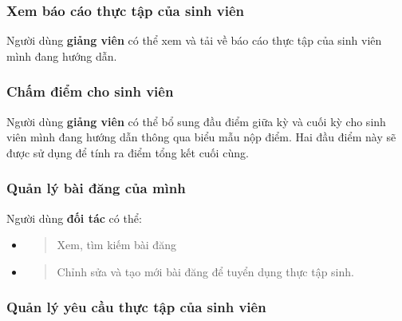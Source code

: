 \documentclass[./../main.tex]{subfiles}
\begin{document}
  \hypertarget{xem-buxe1o-cuxe1o-thux1ef1c-tux1eadp-cux1ee7a-sinh-viuxean}{%
  \subsubsection{Xem báo cáo thực tập của sinh
  viên}\label{xem-buxe1o-cuxe1o-thux1ef1c-tux1eadp-cux1ee7a-sinh-viuxean}}
  
  Người dùng \textbf{giảng viên} có thể xem và tải về báo cáo thực tập của
  sinh viên mình đang hướng dẫn.
  
  \hypertarget{chux1ea5m-ux111iux1ec3m-cho-sinh-viuxean}{%
  \subsubsection{Chấm điểm cho sinh
  viên}\label{chux1ea5m-ux111iux1ec3m-cho-sinh-viuxean}}
  
  Người dùng \textbf{giảng viên} có thể bổ sung đầu điểm giữa kỳ và cuối
  kỳ cho sinh viên mình đang hướng dẫn thông qua biểu mẫu nộp điểm. Hai
  đầu điểm này sẽ được sử dụng để tính ra điểm tổng kết cuối cùng.
  
  \hypertarget{quux1ea3n-luxfd-buxe0i-ux111ux103ng-cux1ee7a-muxecnh}{%
  \subsubsection{Quản lý bài đăng của
  mình}\label{quux1ea3n-luxfd-buxe0i-ux111ux103ng-cux1ee7a-muxecnh}}
  
  Người dùng \textbf{đối tác} có thể:
  
  \begin{itemize}
  \item
    \begin{quote}
    Xem, tìm kiếm bài đăng
    \end{quote}
  \item
    \begin{quote}
    Chỉnh sửa và tạo mới bài đăng để tuyển dụng thực tập sinh.
    \end{quote}
  \end{itemize}
  
  \hypertarget{quux1ea3n-luxfd-yuxeau-cux1ea7u-thux1ef1c-tux1eadp-cux1ee7a-sinh-viuxean}{%
  \subsubsection{Quản lý yêu cầu thực tập của sinh
  viên}\label{quux1ea3n-luxfd-yuxeau-cux1ea7u-thux1ef1c-tux1eadp-cux1ee7a-sinh-viuxean}}
  
\end{document}
